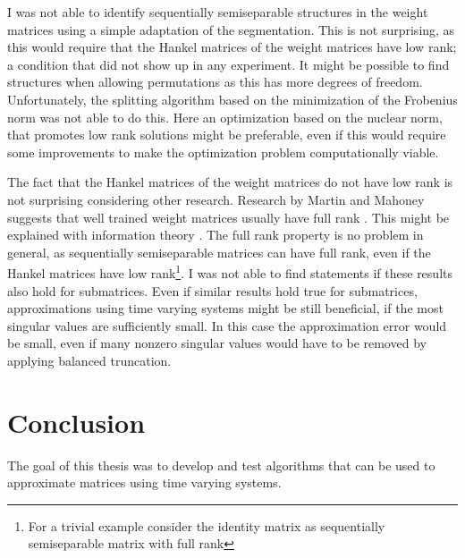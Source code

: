 \documentclass[numbers=noenddot,doctype=mastersthesis,BCOR=15mm,biblatex]{ldvbook}%
\begin{document}
I was not able to identify sequentially semiseparable structures in the weight matrices using a simple adaptation of the segmentation.
This is not surprising, as this would require that the Hankel matrices of the weight matrices have low rank; a condition that did not show up in any experiment.
It might be possible to find structures when allowing permutations as this has more degrees of freedom. 
Unfortunately, the splitting algorithm based on the minimization of the Frobenius norm was not able to do this.
Here an optimization based on the nuclear norm, that promotes low rank solutions might be preferable, even if this would require some improvements to make the optimization problem computationally viable.

The fact that the Hankel matrices of the weight matrices do not have low rank is not surprising considering other research.
Research by Martin and Mahoney suggests that well trained weight matrices usually have full rank \cite{martin_implicit_2021}.
This might be explained with information theory \cite{papyan_traces_2020}.
The full rank property is no problem in general, as sequentially semiseparable matrices can have full rank, even if the Hankel matrices have low rank\footnote{For a trivial example consider the identity matrix as sequentially semiseparable matrix with full rank}.
I was not able to find statements if these results also hold for submatrices.
Even if similar results hold true for submatrices, approximations using time varying systems might be still beneficial, if the most singular values are sufficiently small.
In this case the approximation error would be small, even if many nonzero singular values would have to be removed by applying balanced truncation.




\chapter{Conclusion}\label{chap:conclusion}
The goal of this thesis was to develop and test algorithms that can be used to approximate matrices using time varying systems.
\end{document}
